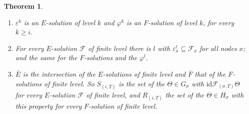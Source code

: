 \documentclass[11pt]{amsart}
\newtheorem{thm}{Theorem}[section]
\theoremstyle{definition}
\newcommand{\id}{\mathrm{id}}
\begin{document}
\begin{thm}\label{thm:level}
\begin{enumerate}
\item[(a)] $\varepsilon^k$ is an $E$-solution of level $k$ and
$\varphi^k$ is an $F$-solution of level $k$, for every $k\ge i$.
\item[(b)] For every $E$-solution $\mathcal F$ of finite level there
is $l$ with $\varepsilon^l_x\subseteq\mathcal F_x$ for all nodes $x$;
and the same for the $F$-solutions and the $\varphi^l$.
\item[(c)] $\bar E$ is the intersection of the $E$-solutions of
finite level and $\bar F$ that of the $F$-solutions of finite level.
So $S_{(i,T)}$ is the set of the $\Theta\in G_\sigma$ with
$\id\mathrel{\mathcal F_{(\sigma,T)}}\Theta$ for every $E$-solution
$\mathcal F$ of finite level, and $R_{(i,T)}$ the set of the
$\Theta\in H_\sigma$ with this property for every $F$-solution of
finite level.
\end{enumerate}
\end{thm}
\end{document}
